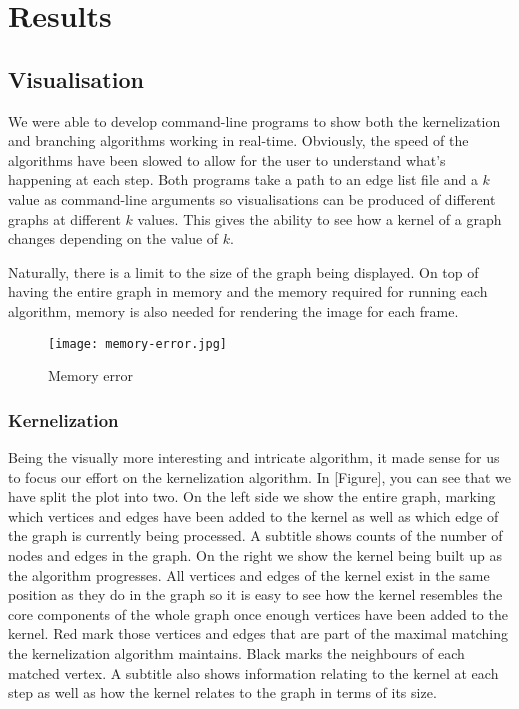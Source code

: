 \section{Results}

\subsection{Visualisation}

We were able to develop command-line programs to show both the
kernelization and branching algorithms working in real-time. Obviously,
the speed of the algorithms have been slowed to allow for the user to
understand what's happening at each step. Both programs take a path to
an edge list file and a \(k\) value as command-line arguments so
visualisations can be produced of different graphs at different \(k\)
values. This gives the ability to see how a kernel of a graph changes
depending on the value of \(k\).

Naturally, there is a limit to the size of the graph being displayed. On
top of having the entire graph in memory and the memory required for
running each algorithm, memory is also needed for rendering the image
for each frame.

\begin{figure}[h]
    \centering
    \texttt{[image: memory-error.jpg]}
    \caption{Memory error}
\end{figure}

\subsubsection{Kernelization}

Being the visually more interesting and intricate algorithm, it made
sense for us to focus our effort on the kernelization algorithm. In
{[}Figure{]}, you can see that we have split the plot into two. On the
left side we show the entire graph, marking which vertices and edges
have been added to the kernel as well as which edge of the graph is
currently being processed. A subtitle shows counts of the number of
nodes and edges in the graph. On the right we show the kernel being
built up as the algorithm progresses. All vertices and edges of the
kernel exist in the same position as they do in the graph so it is easy
to see how the kernel resembles the core components of the whole graph
once enough vertices have been added to the kernel. Red mark those
vertices and edges that are part of the maximal matching the
kernelization algorithm maintains. Black marks the neighbours of each
matched vertex. A subtitle also shows information relating to the kernel
at each step as well as how the kernel relates to the graph in terms of
its size.

